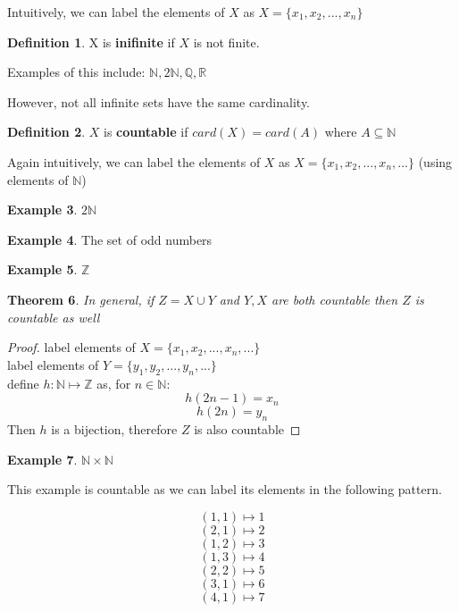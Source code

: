 \documentclass[12pt]{article}
\theoremstyle{plain}
\newtheorem{theorem}{Theorem}[section]
\theoremstyle{definition}
\newtheorem{definition}[theorem]{Definition}
\newtheorem{example}[theorem]{Example}
\begin{document}
Intuitively, we can label the elements of $X$ as $X = \{ x_1, x_2, ..., x_n \}$

\begin{definition}
	X is \textbf{inifinite} if $X$ is not finite.
\end{definition}

Examples of this include: $\mathbb{N}, 2\mathbb{N}, \mathbb{Q}, \mathbb{R}$

However, not all infinite sets have the same cardinality.

\begin{definition}
	$X$ is \textbf{countable} if $card(X) = card(A)$ where $A \subseteq \mathbb{N}$
\end{definition}

Again intuitively, we can label the elements of $X$ as $X = \{ x_1, x_2, ..., x_n, ... \}$ (using elements of $\mathbb{N}$)

\begin{example}
	$2\mathbb{N}$
\end{example}

\begin{example}
	The set of odd numbers
\end{example}

\begin{example}
	$\mathbb{Z}$
\end{example}

\begin{theorem}
	In general, if $Z=X \cup Y$ and $Y,X$ are both countable then $Z$ is countable as well
\end{theorem}

\begin{proof}
	label elements of $X = \{ x_1, x_2, ..., x_n, ... \}$\\
	label elements of $Y = \{ y_1, y_2, ..., y_n, ... \}$\\
	define $h:\mathbb{N}\mapsto \mathbb{Z}$ as, for $n\in\mathbb{N}$:\\
	$$h(2n-1)=x_n$$
	$$h(2n)=y_n$$
	Then $h$ is a bijection, therefore $Z$ is also countable
\end{proof}

\begin{example}
	$\mathbb{N} \times  \mathbb{N}$
\end{example}

This example is countable as we can label its elements in the following pattern.

$$(1,1) \mapsto 1$$
$$(2,1) \mapsto 2$$
$$(1,2) \mapsto 3$$
$$(1,3) \mapsto 4$$
$$(2,2) \mapsto 5$$
$$(3,1) \mapsto 6$$
$$(4,1) \mapsto 7$$
\end{document}
